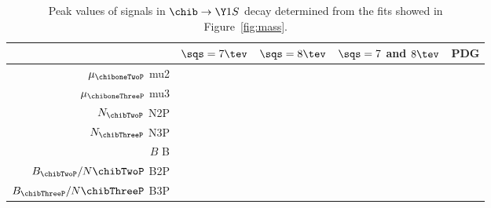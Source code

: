 \begin{table}[H]
\caption{\small Peak values of \chib signals in $\chib \to \Y1S$ decay determined
from the fits showed in Figure~\ref{fig:mass}.}
\begin{tabular}{rcccc}
& $\sqs=7 \tev$ & $\sqs=8\tev$ & $\sqs=7$ and $8\tev$ & PDG \\
\hline
$\mu_{\chiboneTwoP}$ {{mu2}} \\
$\mu_{\chiboneThreeP}$ {{mu3}} \\
\rule{0pt}{4ex}$N_{\chibTwoP}$ {{N2P}} \\
$N_{\chibThreeP}$ {{N3P}} \\
\rule{0pt}{4ex}$B$ {{B}} \\
$B_{\chibTwoP}/N{\chibTwoP}$ {{B2P}} \\
$B_{\chibThreeP}/N{\chibThreeP}$ {{B3P}} \\
\end{tabular}
\label{tab:mass}
\end{table}